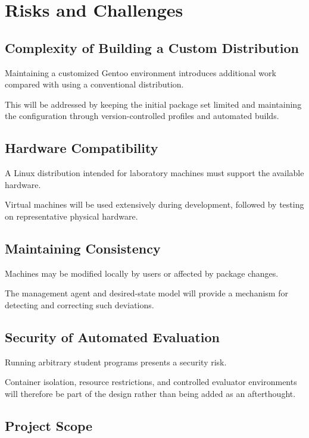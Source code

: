 \documentclass[12pt,a4paper]{article}
\begin{document}
\section{Risks and Challenges}

\subsection{Complexity of Building a Custom Distribution}

Maintaining a customized Gentoo environment introduces additional work compared with using a conventional distribution.

This will be addressed by keeping the initial package set limited and maintaining the configuration through version-controlled profiles and automated builds.

\subsection{Hardware Compatibility}

A Linux distribution intended for laboratory machines must support the available hardware.

Virtual machines will be used extensively during development, followed by testing on representative physical hardware.

\subsection{Maintaining Consistency}

Machines may be modified locally by users or affected by package changes.

The management agent and desired-state model will provide a mechanism for detecting and correcting such deviations.

\subsection{Security of Automated Evaluation}

Running arbitrary student programs presents a security risk.

Container isolation, resource restrictions, and controlled evaluator environments will therefore be part of the design rather than being added as an afterthought.

\subsection{Project Scope}
\end{document}
